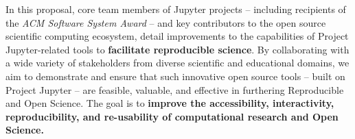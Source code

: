 \begin{draft}
In this proposal, core team members of Jupyter projects -- including
recipients of the \emph{ACM Software System Award} -- and key contributors to
the open source scientific computing ecosystem, detail improvements to the
capabilities of Project Jupyter-related tools to \textbf{facilitate reproducible science}.
By collaborating with a wide variety
of stakeholders from diverse scientific and educational domains, we aim to
demonstrate and ensure that such innovative open source tools -- built on Project
Jupyter -- are feasible, valuable, and effective in furthering Reproducible and Open Science. The
goal is to \textbf{improve the accessibility, interactivity,
  reproducibility, and re-usability of computational research and Open Science.}

\end{draft}

\draftpage

